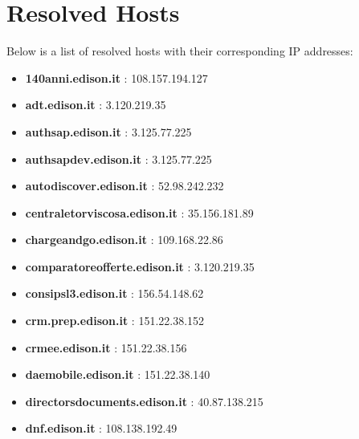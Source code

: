 \documentclass{article}
\begin{document}
\clearpage

\section{Resolved Hosts}

Below is a list of resolved hosts with their corresponding IP addresses:

\begin{itemize}
    
        
            \item \textbf{ 140anni.edison.it }: 108.157.194.127
        
            \item \textbf{ adt.edison.it }: 3.120.219.35
        
            \item \textbf{ authsap.edison.it }: 3.125.77.225
        
            \item \textbf{ authsapdev.edison.it }: 3.125.77.225
        
            \item \textbf{ autodiscover.edison.it }: 52.98.242.232
        
            \item \textbf{ centraletorviscosa.edison.it }: 35.156.181.89
        
            \item \textbf{ chargeandgo.edison.it }: 109.168.22.86
        
            \item \textbf{ comparatoreofferte.edison.it }: 3.120.219.35
        
            \item \textbf{ consipsl3.edison.it }: 156.54.148.62
        
            \item \textbf{ crm.prep.edison.it }: 151.22.38.152
        
            \item \textbf{ crmee.edison.it }: 151.22.38.156
        
            \item \textbf{ daemobile.edison.it }: 151.22.38.140
        
            \item \textbf{ directorsdocuments.edison.it }: 40.87.138.215
        
            \item \textbf{ dnf.edison.it }: 108.138.192.49
        

\end{itemize}
\end{document}

